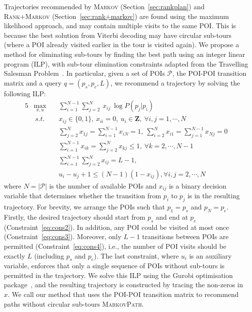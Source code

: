 Trajectories recommended by \textsc{Markov} (Section~\ref{sec:rankplan}) and \textsc{Rank+Markov} (Section~\ref{sec:rank+markov})
are found using the maximum likelihood approach, and may contain multiple visits to the same POI.
This is because the best solution from Viterbi decoding may have
circular sub-tours (where a POI already visited earlier in the tour is visited again).
We propose a method for eliminating sub-tours by finding the best path using an integer linear program (ILP),
with sub-tour elimination constraints adapted from the Travelling Salesman Problem~\cite{opt98}.
In particular, given a set of POIs $\mathcal{P}$, the POI-POI transition matrix and a query $q = (p_s, p_e, L)$,
we recommend a trajectory by solving the following ILP:
\vspace{-0.3em}
\begin{alignat}{5}
& \max_{x,u}  ~&& \sum_{i=1}^{N-1} \sum_{j=2}^N ~x_{ij} ~\log P(p_j | p_i)                                                \nonumber \\
& ~s.t. ~&& x_{ij} \in \{0, 1\}, ~x_{ii} = 0, ~u_i \in \mathbf{Z}, ~\forall i, j = 1, \cdots, N                    \label{eq:cons1} \\
&        && \sum_{j=2}^N x_{1j} = \sum_{i=1}^{N-1} x_{iN} = 1, ~\sum_{i=2}^N x_{i1} = \sum_{j=1}^{N-1} x_{Nj} = 0  \label{eq:cons2} \\
&        && \sum_{i=1}^{N-1} x_{ik} = \sum_{j=2}^N x_{kj} \le 1,   ~\forall k=2, \cdots, N-1                       \label{eq:cons3} \\
&        && \sum_{i=1}^{N-1} \sum_{j=2}^N x_{ij} = L-1,                                                            \label{eq:cons4} \\
&        && u_i - u_j + 1 \le (N-1) (1-x_{ij}),                     \forall i, j = 2, \cdots, N                    \label{eq:cons5}
\end{alignat}
where $N=|\mathcal{P}|$ is the number of available POIs and $x_{ij}$ is a binary decision variable
that determines whether the transition from $p_i$ to $p_j$ is in the resulting trajectory.
For brevity, we arrange the POIs such that $p_1 = p_s$ and $p_N = p_e$.
Firstly, the desired trajectory should start from $p_s$ and end at $p_e$ (Constraint~\ref{eq:cons2}).
In addition, any POI could be visited at most once (Constraint~\ref{eq:cons3}).
Moreover, only $L-1$ transitions between POIs are permitted (Constraint~\ref{eq:cons4}),
i.e., the number of POI visits should be exactly $L$ (including $p_s$ and $p_e$).
The last constraint, where $u_i$ is an auxiliary variable,
enforces that only a single sequence of POIs without sub-tours is permitted in the trajectory.
We solve this ILP using the Gurobi optimisation package~\cite{gurobi}, 
and the resulting trajectory is constructed by tracing the non-zeros in $x$. 
We call our method that uses the POI-POI transition matrix to recommend paths
without circular sub-tours \textsc{MarkovPath}.


